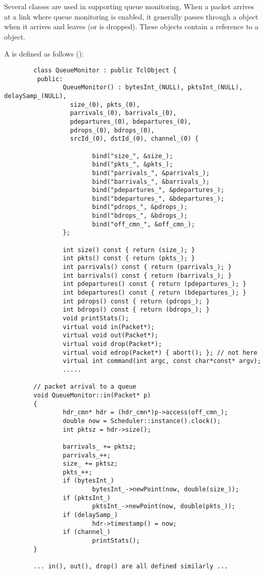 Several classes are used in supporting queue monitoring.
When a packet arrives at a link where queue monitoring is enabled,
it generally passes through a  object when it
arrives and leaves (or is dropped).
These objects contain a reference to a  object.

A  is defined as follows ():
\begin{small}
\begin{verbatim}
        class QueueMonitor : public TclObject {
         public: 
                QueueMonitor() : bytesInt_(NULL), pktsInt_(NULL), delaySamp_(NULL),
                  size_(0), pkts_(0),
                  parrivals_(0), barrivals_(0),
                  pdepartures_(0), bdepartures_(0),
                  pdrops_(0), bdrops_(0),
                  srcId_(0), dstId_(0), channel_(0) {

                        bind("size_", &size_);
                        bind("pkts_", &pkts_);
                        bind("parrivals_", &parrivals_);
                        bind("barrivals_", &barrivals_);
                        bind("pdepartures_", &pdepartures_);
                        bind("bdepartures_", &bdepartures_);
                        bind("pdrops_", &pdrops_);
                        bind("bdrops_", &bdrops_);
                        bind("off_cmn_", &off_cmn_);
                };

                int size() const { return (size_); }
                int pkts() const { return (pkts_); }
                int parrivals() const { return (parrivals_); }
                int barrivals() const { return (barrivals_); }
                int pdepartures() const { return (pdepartures_); }
                int bdepartures() const { return (bdepartures_); }
                int pdrops() const { return (pdrops_); }
                int bdrops() const { return (bdrops_); }
                void printStats();
                virtual void in(Packet*);
                virtual void out(Packet*);
                virtual void drop(Packet*);
                virtual void edrop(Packet*) { abort(); }; // not here
                virtual int command(int argc, const char*const* argv);
                .....

        // packet arrival to a queue
        void QueueMonitor::in(Packet* p)
        {
                hdr_cmn* hdr = (hdr_cmn*)p->access(off_cmn_);
                double now = Scheduler::instance().clock();
                int pktsz = hdr->size();

                barrivals_ += pktsz;
                parrivals_++;
                size_ += pktsz;
                pkts_++;
                if (bytesInt_)
                        bytesInt_->newPoint(now, double(size_));
                if (pktsInt_)
                        pktsInt_->newPoint(now, double(pkts_));
                if (delaySamp_)
                        hdr->timestamp() = now;
                if (channel_)
                        printStats();
        }

        ... in(), out(), drop() are all defined similarly ...
\end{verbatim}
\end{small}
